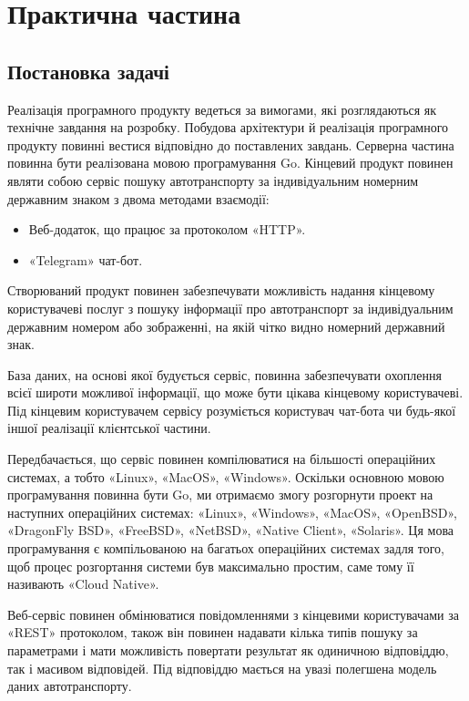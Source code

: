 
\chapter{Практична частина}

\section{Постановка задачі}

Реалізація програмного продукту ведеться за вимогами, які розглядаються як технічне завдання на розробку. Побудова архітектури й реалізація програмного
продукту повинні вестися відповідно до поставлених завдань.
Серверна частина повинна бути реалізована мовою програмування Go.
Кінцевий продукт повинен являти собою сервіс пошуку автотранспорту
за індивідуальним номерним державним знаком з двома методами
взаємодії:

\begin{itemize}
  \item Веб-додаток, що працює за протоколом «HTTP».
  \item «Telegram» чат-бот.
\end{itemize}

Створюваний продукт повинен забезпечувати можливість
надання кінцевому користувачеві послуг з пошуку інформації про
автотранспорт за індивідуальним державним номером
або зображенні, на якій чітко видно номерний державний знак.

База даних, на основі якої будується сервіс, повинна
забезпечувати охоплення всієї широти можливої інформації, що може бути
цікава кінцевому користувачеві. Під кінцевим користувачем сервісу
розуміється користувач чат-бота чи будь-якої іншої реалізації клієнтської частини.

Передбачається, що сервіс повинен компілюватися на більшості операційних системах,
а тобто «Linux», «MacOS», «Windows».
Оскільки основною мовою програмування повинна бути Go, ми отримаємо змогу
розгорнути проект на наступних операційних системах:
«Linux», «Windows», «MacOS», «OpenBSD», «DragonFly BSD», «FreeBSD», «NetBSD», «Native Client», «Solaris».
Ця мова програмування є компільованою на багатьох операційних системах задля того, щоб процес розгортання
системи був максимально простим, саме тому її називають «Cloud Native».

Веб-сервіс повинен обмінюватися повідомленнями з кінцевими
користувачами за «REST» протоколом, також він повинен
надавати кілька типів пошуку за параметрами і мати можливість
повертати результат як одиничною відповіддю, так і масивом відповідей.
Під відповіддю мається на увазі полегшена модель даних автотранспорту.

